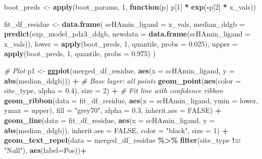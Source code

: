\documentclass[
]{article}
\newenvironment{Shaded}{\begin{snugshade}}{\end{snugshade}}
\newcommand{\AttributeTok}[1]{\textcolor[rgb]{0.13,0.29,0.53}{#1}}
\newcommand{\CommentTok}[1]{\textcolor[rgb]{0.56,0.35,0.01}{\textit{#1}}}
\newcommand{\ConstantTok}[1]{\textcolor[rgb]{0.56,0.35,0.01}{#1}}
\newcommand{\ControlFlowTok}[1]{\textcolor[rgb]{0.13,0.29,0.53}{\textbf{#1}}}
\newcommand{\DecValTok}[1]{\textcolor[rgb]{0.00,0.00,0.81}{#1}}
\newcommand{\FloatTok}[1]{\textcolor[rgb]{0.00,0.00,0.81}{#1}}
\newcommand{\FunctionTok}[1]{\textcolor[rgb]{0.13,0.29,0.53}{\textbf{#1}}}
\newcommand{\NormalTok}[1]{#1}
\newcommand{\OtherTok}[1]{\textcolor[rgb]{0.56,0.35,0.01}{#1}}
\newcommand{\SpecialCharTok}[1]{\textcolor[rgb]{0.81,0.36,0.00}{\textbf{#1}}}
\newcommand{\StringTok}[1]{\textcolor[rgb]{0.31,0.60,0.02}{#1}}
\begin{document}
\begin{Shaded}
\begin{Highlighting}[]
\NormalTok{boot\_preds }\OtherTok{\textless{}{-}} \FunctionTok{apply}\NormalTok{(boot\_params, }\DecValTok{1}\NormalTok{, }\ControlFlowTok{function}\NormalTok{(p) p[}\DecValTok{1}\NormalTok{] }\SpecialCharTok{*} \FunctionTok{exp}\NormalTok{(}\SpecialCharTok{{-}}\NormalTok{p[}\DecValTok{2}\NormalTok{] }\SpecialCharTok{*}\NormalTok{ x\_vals))}

\NormalTok{fit\_df\_residue }\OtherTok{\textless{}{-}} \FunctionTok{data.frame}\NormalTok{(}
  \AttributeTok{scHAmin\_ligand =}\NormalTok{ x\_vals,}
  \AttributeTok{median\_ddgb =} \FunctionTok{predict}\NormalTok{(exp\_model\_pdz3\_ddgb, }\AttributeTok{newdata =} \FunctionTok{data.frame}\NormalTok{(}\AttributeTok{scHAmin\_ligand =}\NormalTok{ x\_vals)),}
  \AttributeTok{lower =} \FunctionTok{apply}\NormalTok{(boot\_preds, }\DecValTok{1}\NormalTok{, quantile, }\AttributeTok{probs =} \FloatTok{0.025}\NormalTok{),}
  \AttributeTok{upper =} \FunctionTok{apply}\NormalTok{(boot\_preds, }\DecValTok{1}\NormalTok{, quantile, }\AttributeTok{probs =} \FloatTok{0.975}\NormalTok{)}
\NormalTok{)}

\CommentTok{\# Plot}
\NormalTok{p1 }\OtherTok{\textless{}{-}} \FunctionTok{ggplot}\NormalTok{(merged\_df\_residue, }\FunctionTok{aes}\NormalTok{(}\AttributeTok{x =}\NormalTok{ scHAmin\_ligand, }\AttributeTok{y =} \FunctionTok{abs}\NormalTok{(median\_ddgb))) }\SpecialCharTok{+}
  \CommentTok{\# Base layer: all points}
  \FunctionTok{geom\_point}\NormalTok{(}\FunctionTok{aes}\NormalTok{(}\AttributeTok{color =}\NormalTok{ site\_type, }\AttributeTok{alpha =} \FloatTok{0.4}\NormalTok{), }\AttributeTok{size =} \DecValTok{2}\NormalTok{) }\SpecialCharTok{+}
   \CommentTok{\# Fit line with confidence ribbon}
  \FunctionTok{geom\_ribbon}\NormalTok{(}\AttributeTok{data =}\NormalTok{ fit\_df\_residue,}
            \FunctionTok{aes}\NormalTok{(}\AttributeTok{x =}\NormalTok{ scHAmin\_ligand, }\AttributeTok{ymin =}\NormalTok{ lower, }\AttributeTok{ymax =}\NormalTok{ upper),}
            \AttributeTok{fill =} \StringTok{"grey70"}\NormalTok{, }\AttributeTok{alpha =} \FloatTok{0.3}\NormalTok{, }\AttributeTok{inherit.aes =} \ConstantTok{FALSE}\NormalTok{) }\SpecialCharTok{+}
  \FunctionTok{geom\_line}\NormalTok{(}\AttributeTok{data =}\NormalTok{ fit\_df\_residue, }\FunctionTok{aes}\NormalTok{(}\AttributeTok{x =}\NormalTok{ scHAmin\_ligand, }\AttributeTok{y =} \FunctionTok{abs}\NormalTok{(median\_ddgb)),}
          \AttributeTok{inherit.aes =} \ConstantTok{FALSE}\NormalTok{, }\AttributeTok{color =} \StringTok{"black"}\NormalTok{, }\AttributeTok{size =} \DecValTok{1}\NormalTok{) }\SpecialCharTok{+}
  \FunctionTok{geom\_text\_repel}\NormalTok{(}\AttributeTok{data =}\NormalTok{ merged\_df\_residue }\SpecialCharTok{\%\textgreater{}\%} \FunctionTok{filter}\NormalTok{(site\_type }\SpecialCharTok{!=} \StringTok{"Null"}\NormalTok{), }\FunctionTok{aes}\NormalTok{(}\AttributeTok{label=}\NormalTok{Pos))}\SpecialCharTok{+}
  

\end{Highlighting}
\end{Shaded}
\end{document}
